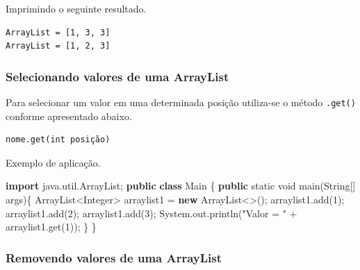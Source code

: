 \documentclass[
]{book}
\newenvironment{Shaded}{\begin{snugshade}}{\end{snugshade}}
\newcommand{\BuiltInTok}[1]{#1}
\newcommand{\DataTypeTok}[1]{\textcolor[rgb]{0.13,0.29,0.53}{#1}}
\newcommand{\DecValTok}[1]{\textcolor[rgb]{0.00,0.00,0.81}{#1}}
\newcommand{\FunctionTok}[1]{\textcolor[rgb]{0.00,0.00,0.00}{#1}}
\newcommand{\ImportTok}[1]{#1}
\newcommand{\KeywordTok}[1]{\textcolor[rgb]{0.13,0.29,0.53}{\textbf{#1}}}
\newcommand{\NormalTok}[1]{#1}
\newcommand{\StringTok}[1]{\textcolor[rgb]{0.31,0.60,0.02}{#1}}
\begin{document}
Imprimindo o seguinte resultado.

\begin{verbatim}
ArrayList = [1, 3, 3]
ArrayList = [1, 2, 3]
\end{verbatim}

\hypertarget{selecionando-valores-de-uma-arraylist}{%
\subsubsection*{Selecionando valores de uma ArrayList}\label{selecionando-valores-de-uma-arraylist}}

Para selecionar um valor em uma determinada posição utiliza-se o método \texttt{.get()} conforme apresentado abaixo.

\begin{verbatim}
nome.get(int posição)
\end{verbatim}

Exemplo de aplicação.

\begin{Shaded}
\begin{Highlighting}[]
\KeywordTok{import}\ImportTok{ java.util.ArrayList;}
\KeywordTok{public} \KeywordTok{class}\NormalTok{ Main \{}
    \KeywordTok{public} \DataTypeTok{static} \DataTypeTok{void} \FunctionTok{main}\NormalTok{(}\BuiltInTok{String}\NormalTok{[] args)\{}
        \BuiltInTok{ArrayList}\NormalTok{<}\BuiltInTok{Integer}\NormalTok{> arraylist1 = }\KeywordTok{new} \BuiltInTok{ArrayList}\NormalTok{<>();}
\NormalTok{        arraylist1.}\FunctionTok{add}\NormalTok{(}\DecValTok{1}\NormalTok{);}
\NormalTok{        arraylist1.}\FunctionTok{add}\NormalTok{(}\DecValTok{2}\NormalTok{);}
\NormalTok{        arraylist1.}\FunctionTok{add}\NormalTok{(}\DecValTok{3}\NormalTok{);}
        \BuiltInTok{System}\NormalTok{.}\FunctionTok{out}\NormalTok{.}\FunctionTok{println}\NormalTok{(}\StringTok{"Valor = "}\NormalTok{ + arraylist1.}\FunctionTok{get}\NormalTok{(}\DecValTok{1}\NormalTok{));}
\NormalTok{    \}}
\NormalTok{\}}
\end{Highlighting}
\end{Shaded}

\hypertarget{removendo-valores-de-uma-arraylist}{%
\subsubsection*{Removendo valores de uma ArrayList}\label{removendo-valores-de-uma-arraylist}}
\end{document}
